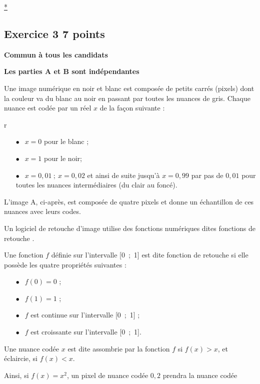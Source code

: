 \documentclass[10pt]{article}
\begin{document}
\hyperlink{Index}{*}

\subsection*{Exercice 3 \hfill 7 points}

\textbf{Commun à tous les candidats}

\medskip 

\textbf{Les parties A et B sont indépendantes}

\medskip
 
Une image numérique en noir et blanc est composée de petits carrés (pixels) dont la couleur va du blanc au noir en passant par toutes les nuances de gris. Chaque nuance est codée par un réel $x$ de la façon suivante : 	

r
\setlength\parindent{8mm}
\begin{itemize}
\item[$\bullet~~$] $x = 0$ pour le blanc ; 
\item[$\bullet~~$] $x = 1$ pour le noir; 
\item[$\bullet~~$] $x = 0,01 \:;\: x = 0,02$ et ainsi de suite jusqu'à $x = 0,99$ par pas de $0,01$ pour toutes les nuances intermédiaires (du clair au foncé).
\end{itemize}
\setlength\parindent{0mm}
 
L'image A, ci-après, est composée de quatre pixels et donne un échantillon de ces nuances avec leurs codes.
 
Un logiciel de retouche d'image utilise des fonctions numériques dites \og fonctions de retouche \fg.
 
Une fonction $f$ définie sur l'intervalle [0~;~1] est dite \og fonction de retouche \fg{} si elle possède les quatre propriétés suivantes : 

\setlength\parindent{8mm}
\begin{itemize}
\item[$\bullet~~$] $f(0) = 0$ ; 
\item[$\bullet~~$] $f(1) = 1$ ; 
\item[$\bullet~~$] $f$ est continue sur l'intervalle [0~;~1] ; 
\item[$\bullet~~$] $f$ est croissante sur l'intervalle [0~;~1].
\end{itemize}
\setlength\parindent{0mm}
 
Une nuance codée $x$ est dite assombrie par la fonction $f$ si $f(x) > x$, et éclaircie, si $f(x) < x$.
 
Ainsi, si $f(x) = x^2$, un pixel de nuance codée $0,2$ prendra la nuance codée
\end{document}
